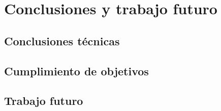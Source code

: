\chapter{Conclusiones y trabajo futuro}

\section{Conclusiones técnicas}

\section{Cumplimiento de objetivos}

\section{Trabajo futuro}



